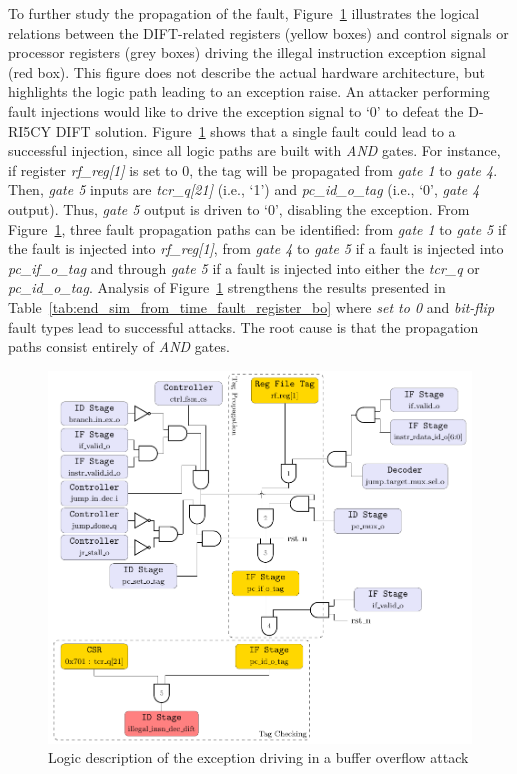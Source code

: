 To further study the propagation of the fault, Figure~\ref{fig:buffer_overflow_tag_propagation} illustrates the logical relations between the DIFT-related registers (yellow boxes) and control signals or processor registers (grey boxes) driving the illegal instruction exception signal (red box). This figure does not describe the actual hardware architecture, but highlights the logic path leading to an exception raise. An attacker performing fault injections would like to drive the exception signal to `0' to defeat the D-RI5CY DIFT solution. Figure~\ref{fig:buffer_overflow_tag_propagation} shows that a single fault could lead to a successful injection, since all logic paths are built with \textit{AND} gates. For instance, if register \textit{rf\_reg[1]} is set to 0, the tag will be propagated from \textit{gate 1} to \textit{gate 4}. Then, \textit{gate 5} inputs are \textit{tcr\_q[21]} (i.e., `1') and \textit{pc\_id\_o\_tag} (i.e., `0',  \textit{gate 4} output). Thus, \textit{gate 5} output is driven to `0', disabling the exception. 
From Figure~\ref{fig:buffer_overflow_tag_propagation}, three fault propagation paths can be identified: from \textit{gate 1} to \textit{gate 5} if the fault is injected into \textit{rf\_reg[1]}, from \textit{gate 4} to \textit{gate 5} if a fault is injected into \textit{pc\_if\_o\_tag} and through \textit{gate 5} if a fault is injected into either the \textit{tcr\_q} or \textit{pc\_id\_o\_tag}.
Analysis of Figure~\ref{fig:buffer_overflow_tag_propagation} strengthens the results presented in Table~\ref{tab:end_sim_from_time_fault_register_bo} where \textit{set to 0} and \textit{bit-flip} fault types lead to successful attacks. The root cause is that the propagation paths consist entirely of \textit{AND} gates. 

\begin{figure}[ht]
    \centering
    \includegraphics[width=\textwidth]{c3_vulnerabilities_assessment/img/buffer_overflow/arborescence_bufferOverflow.pdf}
    \caption{Logic description of the exception driving in a buffer overflow attack}
    \label{fig:buffer_overflow_tag_propagation}
\end{figure}

